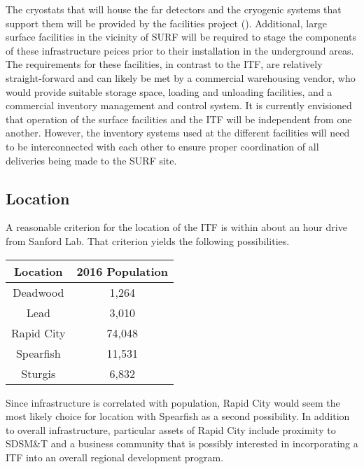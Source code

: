 The cryostats that will house the far detectors and the cryogenic systems
that support them will be provided by the facilities project ().
Additional, large surface facilities in the vicinity of SURF will be
required to stage the components of these infrastructure peices prior to
their installation in the underground areas.  The requirements for these
facilities, in contrast to the ITF, are relatively straight-forward and
can likely be met by a commercial warehousing vendor, who would provide
suitable storage space, loading and unloading facilities, and a commercial
inventory management and control system.  It is currently envisioned that
operation of the  surface facilities and the  ITF
will be independent from one another.  However, the inventory systems used
at the different facilities will need to be interconnected with each other
to ensure proper coordination of all deliveries being made to the SURF site.


\subsection{Location }
A reasonable criterion for the location of the ITF is within about an
hour drive from Sanford Lab. That criterion yields the following
possibilities.
\begin{center}
\begin{tabular}{ |c|c| } \hline
{\bf Location} & {\bf 2016 Population}  \\ \hline 
Deadwood & 1,264  \\ 
Lead & 3,010  \\
Rapid City & 74,048  \\
Spearfish & 11,531  \\
Sturgis & 6,832  \\ \hline
\end{tabular}
\end{center}
Since infrastructure is correlated with population, Rapid City would
seem the most likely choice for location with Spearfish as a second
possibility. In addition to overall infrastructure, particular assets
of Rapid City include proximity to SDSM\&T and a business community
that is possibly interested in incorporating a  ITF into
an overall regional development program.

